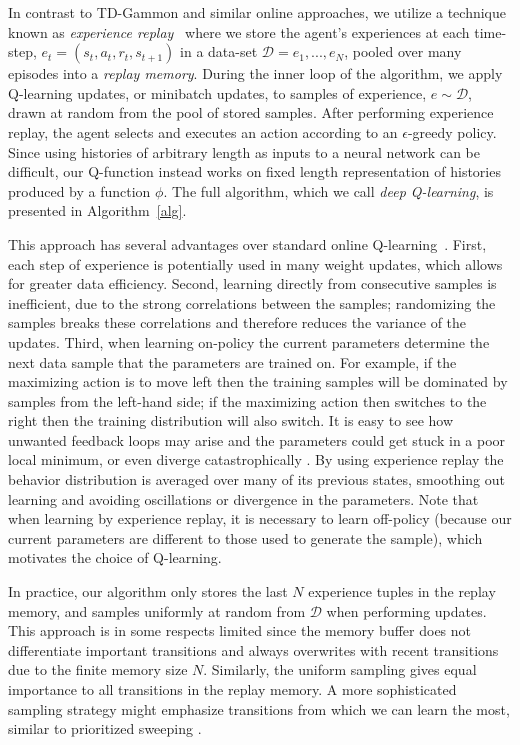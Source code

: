 \documentclass{article} \usepackage{nips13submit_e,times}
\begin{document}
In contrast to TD-Gammon and similar online approaches, we utilize a technique known as \emph{experience replay}~\cite{lin1993reinforcement} where we store the agent's experiences at each time-step, $e_t = (s_t, a_t, r_t, s_{t+1})$ in a data-set $\mathcal{D} = e_1, ..., e_N$, pooled over many episodes into a \emph{replay memory}. During the inner loop of the algorithm, we apply Q-learning updates, or minibatch updates, to samples of experience, $e \sim \mathcal{D}$, drawn at random from the pool of stored samples. After performing experience replay, the agent selects and executes an action according to an $\epsilon$-greedy policy. Since using histories of arbitrary length as inputs to a neural network can be difficult, our Q-function instead works on fixed length representation of histories produced by a function $\phi$. The full algorithm, which we call \emph{deep Q-learning}, is presented in Algorithm~\ref{alg}.

This approach has several advantages over standard online Q-learning~\cite{sutton:book}. First, each step of experience is potentially used in many weight updates, which allows for greater data efficiency. Second, learning directly from consecutive samples is inefficient, due to the strong correlations between the samples; randomizing the samples breaks these correlations and therefore reduces the variance of the updates. Third, when learning on-policy the current parameters determine the next data sample that the parameters are trained on. For example, if the maximizing action is to move left then the training samples will be dominated by samples from the left-hand side; if the maximizing action then switches to the right then the training distribution will also switch. It is easy to see how unwanted feedback loops may arise and the parameters could get stuck in a poor local minimum, or even diverge catastrophically \cite{tsitsiklis:td-convergence}. By using experience replay the behavior distribution is averaged over many of its previous states, smoothing out learning and avoiding oscillations or divergence in the parameters. Note that when learning by experience replay, it is necessary to learn off-policy (because our current parameters are different to those used to generate the sample), which motivates the choice of Q-learning.

In practice, our algorithm only stores the last $N$ experience tuples in the replay memory, and samples uniformly at random from $\mathcal{D}$ when performing updates. This approach is in some respects limited since the memory buffer does not differentiate important transitions and always overwrites with recent transitions due to the finite memory size $N$. Similarly, the uniform sampling gives equal importance to all transitions in the replay memory. A more sophisticated sampling strategy might emphasize transitions from which we can learn the most, similar to prioritized sweeping \cite{moore:prioritized}.  
\end{document}

